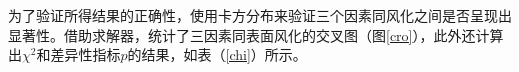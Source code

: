 \documentclass{my_paper}
\begin{document}
  为了验证所得结果的正确性，使用卡方分布来验证三个因素同风化之间是否呈现出显著性。借助求解器\cite{5}，统计了三因素同表面风化的交叉图（图\ref{cro}），此外还计算出$\chi^2$和差异性指标$p$的结果，如表（\ref{chi}）所示。
  \begin{figure}[htbp]
      \centering  %
      \\
\end{figure}
\end{document}
